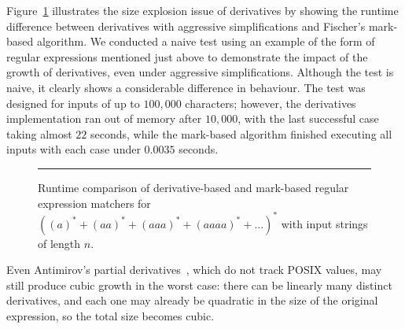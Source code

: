 \documentclass[12pt]{article}
\begin{document}
Figure~\ref{dervsmarGraph} illustrates the size explosion issue of derivatives by showing the 
runtime difference between derivatives with aggressive simplifications and Fischer’s mark-based 
algorithm. We conducted a naive test using an example of the form of regular expressions mentioned 
just above to demonstrate the impact of the growth of derivatives, even under aggressive 
simplifications. Although the test is naive, it clearly shows a considerable difference in behaviour. 
The test was designed for inputs of up to $100{,}000$ characters; however, the derivatives 
implementation ran out of memory after $10{,}000$, with the last successful case taking almost 
$22$ seconds, while the mark-based algorithm finished executing all inputs with each case under 
$0.0035$ seconds.

\begin{figure}[ht]
\mbox{}\bigskip
\begin{center}
    \mbox{}
    \rule{\linewidth}{0.4pt}
\caption{Runtime comparison of derivative-based and mark-based regular expression matchers for $((a)^* + (aa)^* + (aaa)^* + (aaaa)^* + \dots )^*$ with input strings of length $n$.}\label{dervsmarGraph}
\end{center}
\end{figure}


Even Antimirov’s partial derivatives~\cite{Antimirov1996}, which do not track
POSIX values, may still produce cubic growth in the worst case: there can be
linearly many distinct derivatives, and each one may already be quadratic in
the size of the original expression, so the total size becomes cubic.
\end{document}
